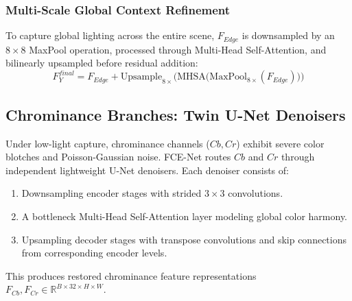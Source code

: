 \documentclass[10pt,twocolumn,letterpaper]{article}
\begin{document}
\subsubsection{Multi-Scale Global Context Refinement}
To capture global lighting across the entire scene, $F_{Edge}$ is downsampled by an $8\times8$ MaxPool operation, processed through Multi-Head Self-Attention, and bilinearly upsampled before residual addition:
\begin{equation}
F_Y^{final} = F_{Edge} + \text{Upsample}_{8\times}\Big( \text{MHSA}\big( \text{MaxPool}_{8\times}(F_{Edge}) \big) \Big)
\end{equation}

\subsection{Chrominance Branches: Twin U-Net Denoisers}
Under low-light capture, chrominance channels ($Cb, Cr$) exhibit severe color blotches and Poisson-Gaussian noise. FCE-Net routes $Cb$ and $Cr$ through independent lightweight U-Net denoisers. Each denoiser consists of:
\begin{enumerate}
    \item Downsampling encoder stages with strided $3\times3$ convolutions.
    \item A bottleneck Multi-Head Self-Attention layer modeling global color harmony.
    \item Upsampling decoder stages with transpose convolutions and skip connections from corresponding encoder levels.
\end{enumerate}
This produces restored chrominance feature representations $F_{Cb}, F_{Cr} \in \mathbb{R}^{B \times 32 \times H \times W}$.
\end{document}
